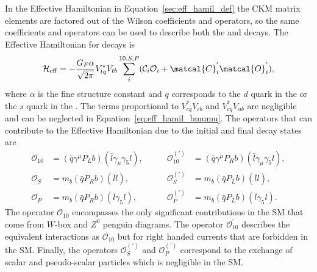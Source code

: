 {{%
In the Effective Hamiltonian in Equation~\ref{sec:eff_hamil_def} the CKM matrix elements are factored out of the Wilson coefficients and operators, so the same coefficients and operators can be used to describe both the \bd and \bs decays.
The Effective Hamiltonian for \bmumu decays is~\cite{DeBruyn:2012wk}
\begin{equation}
\mathcal{H}_{\mathrm{eff}} = -\frac{G_F \alpha}{\sqrt{2\pi}} V_{tq}^{*}V_{tb} \displaystyle\sum_{i}^{10,S,P} (\mathcal{C}_i\mathcal{O}_i + \matcal{C}^{'}_{i}\matcal{O}_{i}^{'}),
\label{eq:eff_hamil_bmumu}
\end{equation}
where $\alpha$ is the fine structure constant and $q$ corresponds to the $d$ quark in the \bd or the $s$ quark in the \bs. The terms proportional to $V^*_{cq}V_{cb}$ and $V^*_{cq}V_{ub}$ are negligible and can be neglected in Equation~\ref{eq:eff_hamil_bmumu}. The operators that can contribute to the \bmumu Effective Hamiltonian due to the initial and final decay states are
\begin{align}
 \mathcal{O}_{10}&=(\bar{q}\gamma^{\mu}P_{L}b)(\bar{l}\gamma_{\mu}\gamma_{5}l), &\qquad
 \mathcal{O}_{10}^{(')}&= (\bar{q}\gamma^{\mu}P_{R}b)(\bar{l}\gamma_{\mu}\gamma_{5}l), \\
 \mathcal{O}_{S}&= m_{b}(\bar{q}P_{R}b)(\bar{l}l),  &\qquad
\mathcal{O}_{S}^{(')}&= m_{b}(\bar{q}P_{L}b)(\bar{l}l), \\
 \mathcal{O}_{P}&= m_{b}(\bar{q}P_{R}b)(\bar{l}\gamma_{5}l), &\qquad
 \mathcal{O}_{P}^{(')}&= m_{b}(\bar{q}P_{L}b)(\bar{l}\gamma_{5}l).
\end{align}
The operator $\mathcal{O}_{10}$ encompasses the only significant contributions in the SM that come from $W$-box and $Z^0$ penguin diagrams. The operator $\mathcal{O}_{10}^'$ describes the equivalent interactions as $\mathcal{O}_{10}$ but for right handed currents that are forbidden in the SM. %
 Finally, the operators $\mathcal{O}_{S}^{(')}$ and $\mathcal{O}_{P}^{(')}$ correspond to the exchange of scalar and pseudo-scalar particles which is negligible in the SM. 

}}

